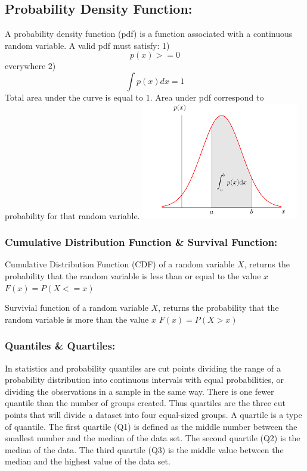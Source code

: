 \documentclass[]{article}
\begin{document}
\hypertarget{probability-density-function}{%
\subsection{Probability Density
Function:}\label{probability-density-function}}

A probability density function (pdf) is a function associated with a
continuous random variable. A valid pdf must satisfy: 1) \[p(x)>=0\]
everywhere 2) \[ \int p(x)dx=1 \] Total area under the curve is equal to
\(1\). Area under pdf correspond to probability for that random
variable. \includegraphics{pdf.png}

\hypertarget{cumulative-distribution-function-survival-function}{%
\subsubsection{Cumulative Distribution Function \& Survival
Function:}\label{cumulative-distribution-function-survival-function}}

Cumulative Distribution Function (CDF) of a random variable \(X\),
returns the probability that the random variable is less than or equal
to the value \(x\) \(F(x)=P(X<=x)\)

Survivial function of a random variable \(X\), returns the probability
that the random variable is more than the value \(x\) \(F(x)=P(X>x)\)

\hypertarget{quantiles-quartiles}{%
\subsubsection{Quantiles \& Quartiles:}\label{quantiles-quartiles}}

In statistics and probability quantiles are cut points dividing the
range of a probability distribution into continuous intervals with equal
probabilities, or dividing the observations in a sample in the same way.
There is one fewer quantile than the number of groups created. Thus
quartiles are the three cut points that will divide a dataset into four
equal-sized groups. A quartile is a type of quantile. The first quartile
(Q1) is defined as the middle number between the smallest number and the
median of the data set. The second quartile (Q2) is the median of the
data. The third quartile (Q3) is the middle value between the median and
the highest value of the data set.
\end{document}
